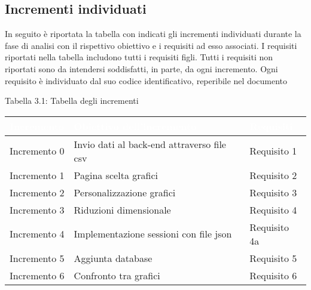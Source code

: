 \subsection{Incrementi individuati}
In seguito è riportata la tabella con indicati gli incrementi individuati durante la fase di analisi con il rispettivo obiettivo e i requisiti ad esso associati.
I requisiti riportati nella tabella includono tutti i requisiti figli. Tutti i requisiti non riportati sono da intendersi soddisfatti, in parte, da ogni incremento.
Ogni requisito è individuato dal suo codice identificativo, reperibile nel documento \AdR
\begin{center}
Tabella 3.1: Tabella degli incrementi
\end{center}
\begin{longtable}{C{3cm} C{5cm} C{3cm}}
\textcolor{white}{\textbf{Incremento}} & 
\textcolor{white}{\textbf{Obiettivo dell'incremento}} & 
\textcolor{white}{\textbf{Requisiti}}\\
\endhead

Incremento 0 & Invio dati al back-end attraverso file csv & Requisito 1\\
Incremento 1 & Pagina scelta grafici & Requisito 2\\
Incremento 2 & Personalizzazione grafici & Requisito 3 \\
Incremento 3 & Riduzioni dimensionale & Requisito 4\\
Incremento 4 & Implementazione sessioni con file json & Requisito 4a\\
Incremento 5 & Aggiunta database & Requisito 5\\
Incremento 6 & Confronto tra grafici & Requisito 6\\

\end{longtable}
